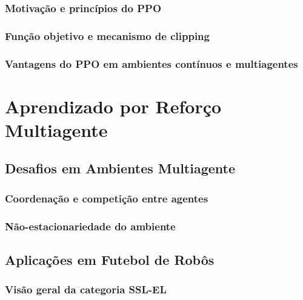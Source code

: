 \subsubsection{Motivação e princípios do PPO}
\label{subsubsec:ppo_principios}

\subsubsection{Função objetivo e mecanismo de clipping}
\label{subsubsec:ppo_objetivo}

\subsubsection{Vantagens do PPO em ambientes contínuos e multiagentes}
\label{subsubsec:ppo_vantagens}

\section{Aprendizado por Reforço Multiagente}
\label{sec:marl}

\subsection{Desafios em Ambientes Multiagente}
\label{subsec:desafios_multi}

\subsubsection{Coordenação e competição entre agentes}
\label{subsubsec:coordenacao}

\subsubsection{Não-estacionariedade do ambiente}
\label{subsubsec:nao_estacionariedade}

\subsection{Aplicações em Futebol de Robôs}
\label{subsec:futebol_robos}

\subsubsection{Visão geral da categoria SSL-EL}
\label{subsubsec:ssl_el}

